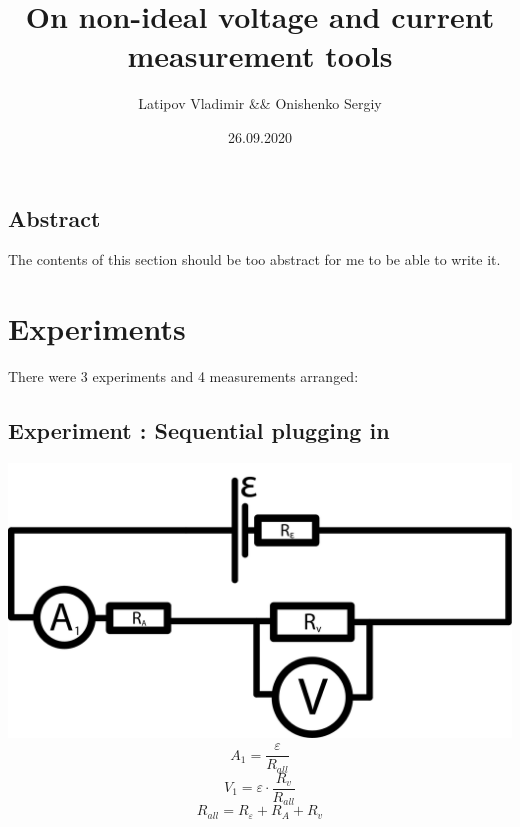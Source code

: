 \documentclass[12pt]{memoir}
\title{\textbf{\Huge{On non-ideal voltage and current measurement tools}}}
\date{26.09.2020}
\author{Latipov Vladimir \&\& Onishenko Sergiy}
\begin{document}

    \maketitle
    \newpage

    \tableofcontents

    \newpage


    \begin{vplace}
    \begin{center}

    \section{Abstract}\label{sec:abstract}
    The contents of this section should be too abstract for me to be able to write it.

    \end{center}
    \end{vplace}

    \newpage

    \section{Experiments}\label{sec:experiments}
    There were 3 experiments and 4 measurements arranged:

    \subsection{Experiment : Sequential plugging in}\label{subsec:experiment-1} %
    \includegraphics[width=\linewidth]{images/schemes/Sequential.png}
    \begin{equation*}
        A_1 = \frac{\varepsilon}{R_{all}}
    \end{equation*}
    \begin{equation*}
        V_1 = \varepsilon \cdot \frac{R_v}{R_{all}}
    \end{equation*}
    \begin{equation*}
        R_{all} = R_\varepsilon + R_A + R_v
    \end{equation*}
\end{document}
